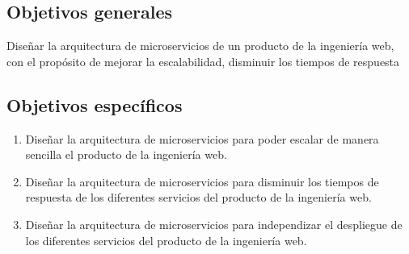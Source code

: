
\subsection{Objetivos generales}
Diseñar la arquitectura de microservicios de un producto de la ingeniería web,
con el propósito de mejorar la escalabilidad, disminuir los tiempos de respuesta



\subsection{Objetivos específicos}

\begin{enumerate}
  \item Diseñar la arquitectura de microservicios para poder escalar de manera sencilla el producto de la ingeniería web.
  \item Diseñar la arquitectura de microservicios para disminuir los tiempos de respuesta de los diferentes servicios del producto de la ingeniería web.
  \item Diseñar la arquitectura de microservicios para independizar el despliegue de los diferentes servicios del producto de la ingeniería web.
\end{enumerate}
